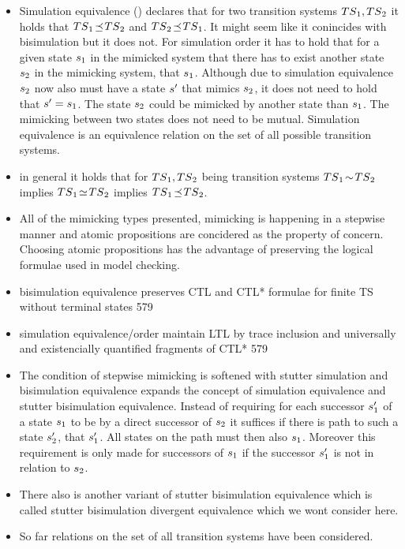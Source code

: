 \documentclass[preview]{standalone}
\begin{document}
\begin{itemize}
			\item Simulation equivalence (\simequiv) declares that for two transition systems ${TS}_1, {TS}_2$ it holds that ${TS}_1 {\;\!\preceq\;\!} {TS}_2$ and ${TS}_2 {\;\!\preceq\;\!} {TS}_1$. It might seem like it conincides with bisimulation but it does not. For simulation order it has to hold that for a given state ${s}_1$ in the mimicked system that there has to exist another state ${s}_2$ in the mimicking system, that \stmimicsN ${s}_1$. Although due to simulation equivalence ${s}_2$ now also must have a state ${s}'$ that mimics ${s}_2$, it does not need to hold that ${s}' = {s}_1$. The state ${s}_2$ could be mimicked by another state than ${s}_1$. The mimicking between two states does not need to be mutual. Simulation equivalence is an equivalence relation on the set of all possible transition systems.
			\item in general it holds that for ${TS}_1, {TS}_2$ being transition systems ${TS}_1 {\;\!\sim\;\!} {TS}_2$ implies ${TS}_1 {\;\!\simeq\;\!} {TS}_2$ implies ${TS}_1 {\;\!\preceq\;\!} {TS}_2$.
			\item All of the mimicking types presented, mimicking is happening in a stepwise manner and atomic propositions are concidered as the property of concern. Choosing atomic propositions has the advantage of preserving the logical formulae used in model checking.	
			\item bisimulation equivalence preserves CTL and CTL* formulae for finite TS without terminal states 579
			\item simulation equivalence/order maintain LTL by trace inclusion and universally and existencially quantified fragments of CTL*  579
			\item The condition of stepwise mimicking is softened with stutter simulation and bisimulation equivalence expands the concept of simulation equivalence and stutter bisimulation equivalence. Instead of requiring for each successor ${s}_1'$ of a state ${s}_1$ to be \stmimickedN by a direct successor of ${s}_2$ it suffices if there is path to such a state ${s}_2'$, that \stmimicsN ${s}_1'$. All states on the path must then also \stmimicN ${s}_1$. Moreover this requirement is only made for successors of ${s}_1$ if the successor ${s}_1'$ is not in relation to ${s}_2$. 
			\item There also is another variant of stutter bisimulation equivalence which is called stutter bisimulation divergent equivalence which we wont consider here.
			\item So far relations on the set of all transition systems have been considered. 

\end{itemize}
\end{document}
